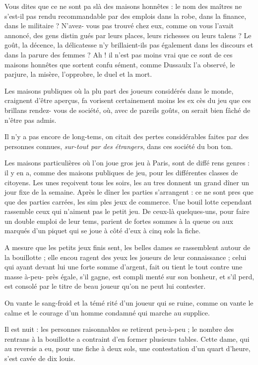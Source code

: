 Vous dites que ce ne sont pa slà des
maisons honnêtes : le nom des maîtres
ne s'est-il pas rendu recommandable
par des emplois dans la robe, dans la
finance, dans le militaire ? N'avez-%
vous pas trouvé chez eux, comme on
vous l'avait annoncé, des gens distin%
gués par leurs places, leurs richesses
ou leurs talens ? Le goût, la décence,
la délicatesse n'y brillaient-ils pas
également dans les discours et dans
la parure des femmes ? Ah ! il n'est
pas moins vrai que ce sont de ces
maisons honnêtes que sortent confu%
sément, comme Dussaulx l'a observé,
le parjure, la misère, l'opprobre, le
duel et la mort.

Les maisons publiques où la plu%
part des joueurs considérés dans le
monde, craignent d'être aperçus, fa%
vorisent certainement moins les ex%
cès du jeu que ces brillans rendez-%
vous de société, où, avec de pareils
goûts, on serait bien fâché de n'être
pas admis.

Il n'y a pas encore de long-tems, on
citait des pertes considérables faites
par des personnes connues, \emph{sur-tout
par des étrangers}, dans ces société
du bon ton.

Les maisons particulières où l'on
joue gros jeu à Paris, sont de diffé%
rens genres : il y en a, comme des
maisons publiques de jeu, pour les
différentes classes de citoyens. Les
unes reçoivent tous les soirs, les au%
tres donnent un grand dîner un jour
fixe de la semaine. Après le dîner les
parties s'arrangent : ce ne sont pres%
que que des parties carrées, les sim%
ples jeux de commerce. Une bouil%
lotte cependant rassemble ceux qui
n'aiment pas le petit jeu. De ceux-là
quelques-uns, pour faire un double
emploi de leur tems, parient de fortes
sommes à la queue ou aux marqués
d'un piquet qui se joue à côté d'eux à
cinq sols la fiche.

A mesure que les petits jeux finis%
sent, les belles dames se rassemblent
autour de la bouillotte ; elle encou%
ragent des yeux les joueurs de leur 
connaissance ; celui qui ayant devant
lui une forte somme d'argent, fait ou
tient le tout contre une masse à-peu-%
près égale, s'il gagne, est compli%
menté sur son bonheur, et s'il perd,
est consolé par le titre de beau joueur
qu'on ne peut lui contester.

On vante le sang-froid et la témé%
rité d'un joueur qui se ruine, comme
on vante le calme et le courage d'un
homme condamné qui marche au
supplice.

Il est nuit : les personnes raisonnables
se retirent peu-à-peu ; le nombre des
rentrans à la bouillotte a contraint d'en
former plusieurs tables. Cette dame,
qui au reversis a eu, pour une fiche
à deux sols, une contestation d'un
quart d'heure, s'est cavée de dix louis.

